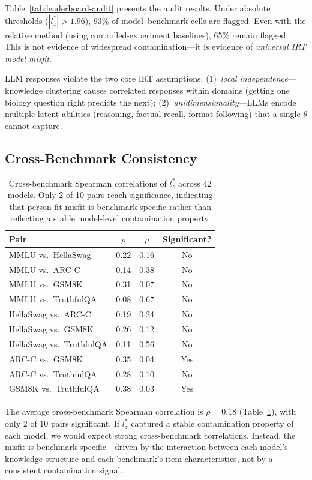 \documentclass[11pt]{article}
\begin{document}
Table~\ref{tab:leaderboard-audit} presents the audit results.
Under absolute thresholds ($|l_z^*| > 1.96$), 93\% of model--benchmark cells are flagged.
Even with the relative method (using controlled-experiment baselines), 65\% remain flagged.
This is not evidence of widespread contamination---it is evidence of \emph{universal IRT model misfit}.

LLM responses violate the two core IRT assumptions:
(1)~\emph{local independence}---knowledge clustering causes correlated responses within domains (getting one biology question right predicts the next);
(2)~\emph{unidimensionality}---LLMs encode multiple latent abilities (reasoning, factual recall, format following) that a single $\theta$ cannot capture.

\subsection{Cross-Benchmark Consistency}

\begin{table}[t]
\centering
\caption{Cross-benchmark Spearman correlations of $l_z^*$ across 42 models. Only 2 of 10 pairs reach significance, indicating that person-fit misfit is benchmark-specific rather than reflecting a stable model-level contamination property.}
\label{tab:cross-benchmark}
\begin{tabular}{lccc}
\toprule
Pair & $\rho$ & $p$ & Significant? \\
\midrule
MMLU vs.\ HellaSwag    & 0.22 & 0.16 & No \\
MMLU vs.\ ARC-C        & 0.14 & 0.38 & No \\
MMLU vs.\ GSM8K        & 0.31 & 0.07 & No \\
MMLU vs.\ TruthfulQA   & 0.08 & 0.67 & No \\
HellaSwag vs.\ ARC-C   & 0.19 & 0.24 & No \\
HellaSwag vs.\ GSM8K   & 0.26 & 0.12 & No \\
HellaSwag vs.\ TruthfulQA & 0.11 & 0.56 & No \\
ARC-C vs.\ GSM8K       & 0.35 & 0.04 & Yes \\
ARC-C vs.\ TruthfulQA  & 0.28 & 0.10 & No \\
GSM8K vs.\ TruthfulQA  & 0.38 & 0.03 & Yes \\
\bottomrule
\end{tabular}
\end{table}

The average cross-benchmark Spearman correlation is $\rho = 0.18$ (Table~\ref{tab:cross-benchmark}), with only 2 of 10 pairs significant.
If $l_z^*$ captured a stable contamination property of each model, we would expect strong cross-benchmark correlations.
Instead, the misfit is benchmark-specific---driven by the interaction between each model's knowledge structure and each benchmark's item characteristics, not by a consistent contamination signal.
\end{document}
